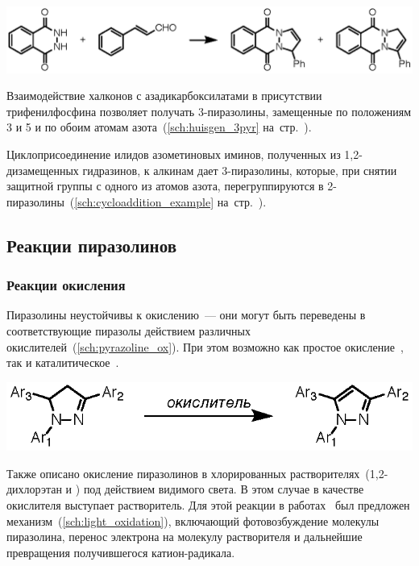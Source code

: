 \begin{scheme}[h!]
    \centering
    \includegraphics{sections/literature/img/3-pyrazoline_isomer.eps}
    \caption{}
    \label{sch:3-pyrazoline_isomer}
\end{scheme}

Взаимодействие халконов с азадикарбоксилатами в присутствии трифенилфосфина позволяет получать 3-пиразолины, замещенные по положениям 3 и 5 и по обоим атомам азота~(\ref{sch:huisgen_3pyr} на~стр.~\pageref{sch:huisgen_3pyr}).

Циклоприсоединение илидов азометиновых иминов, полученных из 1,2-дизамещенных гидразинов, к алкинам дает 3-пиразолины, которые, при снятии защитной группы с одного из атомов азота, перегруппируются в 2-пиразолины~(\ref{sch:cycloaddition_example} на~стр.~\pageref{sch:cycloaddition_example}).
\FloatBarrier{}

\subsection{Реакции пиразолинов}

\subsubsection{Реакции окисления}
Пиразолины неустойчивы к окислению~--- они могут быть переведены в соответствующие пиразолы действием различных окислителей~(\ref{sch:pyrazoline_ox}).
При этом возможно как простое окисление~\cite{Zolfigol2004, Dodwadmath1935, Gladstone1966, Auwers1927, Singh1997, Walker1967}, так и каталитическое~\cite{Nakamichi2002, Kojima2016, Shah1978}.

\begin{scheme}[h!]
    \centering
    \includegraphics{sections/literature/img/pyrazoline_ox.eps}
    \caption{}
    \label{sch:pyrazoline_ox}
\end{scheme}

Также описано окисление пиразолинов в хлорированных растворителях~(1,2-дихлорэтан и ) под действием видимого света.
В этом случае в качестве окислителя выступает растворитель.
Для этой реакции в работах~\cite{Annes2019,Traven2016} был предложен механизм~(\ref{sch:light_oxidation}), включающий фотовозбуждение молекулы пиразолина, перенос электрона на молекулу растворителя и дальнейшие превращения получившегося катион-радикала.

